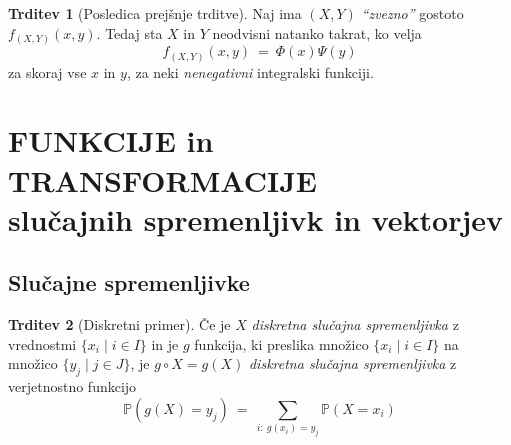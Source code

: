 \documentclass[11pt]{article}
\newcommand{\p}{\mathbb{P}}
\newcommand{\1}{\mathbbm{1}}
\theoremstyle{definition}
\theoremstyle{definition}
\newtheorem{trditev}{Trditev}[section]
\theoremstyle{definition}
\begin{document}
\begin{trditev}[Posledica prejšnje trditve]

Naj ima $(X, Y)$ \textit{``zvezno''} gostoto $f_{(X, Y)}(x, y)$. Tedaj sta $X$ in $Y$ neodvisni natanko takrat, ko velja
$$f_{(X, Y)}(x, y) ~=~ \Phi(x) \Psi(y)$$
za skoraj vse $x$ in $y$, za neki \textit{nenegativni} integralski funkciji.

\end{trditev}
\vspace{0.5cm}

\pagebreak


\section{FUNKCIJE in TRANSFORMACIJE \\slučajnih spremenljivk in vektorjev}
\vspace{0.5cm}


\subsection{Slučajne spremenljivke}
\vspace{0.5cm}

\begin{trditev}[Diskretni primer]

Če je $X$ \textit{diskretna slučajna spremenljivka} z vrednostmi $\{ x_i \mid i \in I \}$ in je $g$ funkcija, ki preslika množico $\{ x_i \mid i \in I \}$ na množico $\{ y_j \mid j \in J \}$, je $g \circ X = g(X)$ \textit{diskretna slučajna spremenljivka} z verjetnostno funkcijo
$$\p(g(X) = y_j) ~=~ \sum_{i:~g(x_i)=y_j} \p(X = x_i)$$

\end{trditev}
\vspace{0.5cm}
\end{document}
